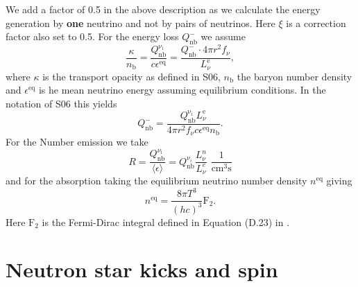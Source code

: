 \documentclass[fleqn,usenatbib]{mnras}
\begin{document}
We add a factor of 0.5 in the above description as we calculate the energy generation by \textbf{one} neutrino and not by pairs of neutrinos. Here $\xi$ is a correction factor also set to 0.5.
For the energy loss $Q_{\mathrm{nb}}^{-}$ we assume
\begin{equation}
\frac{\kappa}{n_{\mathrm{b}}} = \frac{Q_{\mathrm{nb}}^{\mathrm{\nu_i}}}{c \epsilon^{\mathrm{eq}}} = \frac{Q_{\mathrm{nb}}^{-}\cdot 4\pi r^2 f_{\nu}}{L_{\nu}^{\mathrm{e}}}, 
\end{equation}
where $\kappa$ is the transport opacity as defined in S06, $n_{\text{b}}$ the baryon number density and $\epsilon^{\mathrm{eq}}$ is he mean neutrino energy assuming equilibrium conditions.
In the notation of S06 this yields
\begin{equation}
Q_{\mathrm{nb}}^{-} = \frac{Q_{\mathrm{nb}}^{\mathrm{\nu_i}} L_{\nu}^{\mathrm{e}} }{4\pi r^2 f_{\nu} c \epsilon^{\mathrm{eq}} n_{\mathrm{b}}}.
\end{equation}
For the Number emission we take
\begin{equation}
R=\frac{Q_{\mathrm{nb}}^{\nu_{\mathrm{i}}}}{\langle \epsilon \rangle} = Q_{\mathrm{nb}}^{\nu_i} \frac{L_{\nu}^n }{L_{\nu}^e }\,\, \mathrm{\frac{1}{cm^3s}}
\end{equation}
and for the absorption taking the equilibrium neutrino number density $n^{\mathrm{eq}}$ giving
\begin{equation}
n^{\mathrm{eq}} = \frac{8\pi T^3}{(hc)^3}\mathrm{F}_2.
\end{equation}
Here $\mathrm{F}_2$ is the Fermi-Dirac integral defined in Equation (D.23) in \cite{Scheck2006}.


\section{Neutron star kicks and spin}
\label{Appendix:neutron star}
\end{document}
